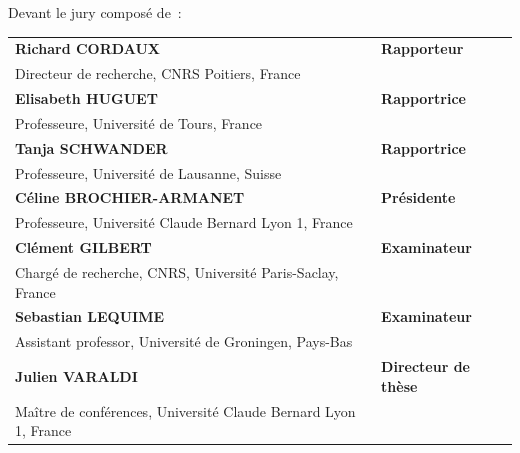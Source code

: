 Devant le jury composé de~:\\

\small {
\begin{tabular}{ll}
    \textbf{Richard CORDAUX} & \textbf{Rapporteur}         \\
    Directeur de recherche, CNRS Poitiers, France \\
    \textbf{Elisabeth HUGUET}      & \textbf{Rapportrice}        \\
    Professeure, Université de Tours, France \\
    \textbf{Tanja SCHWANDER}   & \textbf{Rapportrice}        \\
    Professeure, Université de Lausanne, Suisse \\
    \textbf{Céline BROCHIER-ARMANET}  & \textbf{Présidente}        \\
    Professeure, Université Claude Bernard Lyon 1, France \\
    \textbf{Clément GILBERT}      & \textbf{Examinateur}        \\
    Chargé de recherche, CNRS, Université Paris-Saclay, France \\
    \textbf{Sebastian LEQUIME}      & \textbf{Examinateur}        \\
    Assistant professor, Université de Groningen, Pays-Bas \\
    \textbf{Julien VARALDI}       & \textbf{Directeur de thèse} \\
    Maître de conférences, Université Claude Bernard Lyon 1, France \\
\end{tabular}
}
